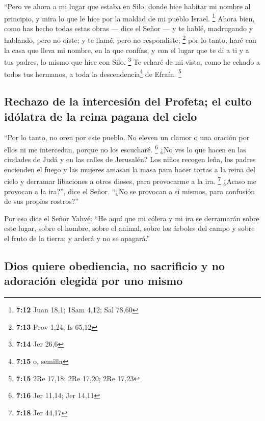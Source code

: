 \begin{paracol}{2}
 ``Pero ve ahora a mi lugar que estaba en Silo, donde
hice habitar mi nombre al principio, y mira lo que le hice por la maldad
de mi pueblo Israel. \footnote{\textbf{7:12} Juan 18,1; 1Sam 4,12; Sal
  78,60}  Ahora bien, como has hecho todas estas obras
--- dice el Señor --- y te hablé, madrugando y hablando, pero no oíste;
y te llamé, pero no respondiste; \footnote{\textbf{7:13} Prov 1,24; Is
  65,12}  por lo tanto, haré con la casa que lleva mi
nombre, en la que confías, y con el lugar que te di a ti y a tus padres,
lo mismo que hice con Silo. \footnote{\textbf{7:14} Jer 26,6}
 Te echaré de mi vista, como he echado a todos tus
hermanos, a toda la descendencia\footnote{\textbf{7:15} o, semilla} de
Efraín. \footnote{\textbf{7:15} 2Re 17,18; 2Re 17,20; 2Re 17,23}

\hypertarget{rechazo-de-la-intercesiuxf3n-del-profeta-el-culto-iduxf3latra-de-la-reina-pagana-del-cielo}{%
\subsection{Rechazo de la intercesión del Profeta; el culto idólatra de
la reina pagana del
cielo}\label{rechazo-de-la-intercesiuxf3n-del-profeta-el-culto-iduxf3latra-de-la-reina-pagana-del-cielo}}

 ``Por lo tanto, no oren por este pueblo. No eleven un
clamor o una oración por ellos ni me intercedan, porque no los
escucharé. \footnote{\textbf{7:16} Jer 11,14; Jer 14,11} 
¿No ves lo que hacen en las ciudades de Judá y en las calles de
Jerusalén?  Los niños recogen leña, los padres encienden
el fuego y las mujeres amasan la masa para hacer tortas a la reina del
cielo y derramar libaciones a otros dioses, para provocarme a la ira.
\footnote{\textbf{7:18} Jer 44,17}  ¿Acaso me provocan a
la ira?'', dice el Señor. ``¿No se provocan a sí mismos, para confusión
de sus propios rostros?''

 Por eso dice el Señor Yahvé: ``He aquí que mi cólera y
mi ira se derramarán sobre este lugar, sobre el hombre, sobre el animal,
sobre los árboles del campo y sobre el fruto de la tierra; y arderá y no
se apagará.''

\hypertarget{dios-quiere-obediencia-no-sacrificio-y-no-adoraciuxf3n-elegida-por-uno-mismo}{%
\subsection{Dios quiere obediencia, no sacrificio y no adoración elegida
por uno
mismo}\label{dios-quiere-obediencia-no-sacrificio-y-no-adoraciuxf3n-elegida-por-uno-mismo}}


\end{paracol}
